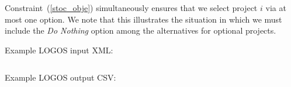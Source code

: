 Constraint~(\ref{stoc_obje}) simultaneously ensures that we select project  $i$
via at most one option. We note that this illustrates the situation in which we
must include the {\it Do Nothing}  option among the alternatives for optional projects.\par

Example LOGOS input XML:
\begin{lstlisting}[style=XML]

\end{lstlisting}

Example LOGOS output CSV:
\begin{lstlisting}[basicstyle=\tiny,language=python]

\end{lstlisting}
